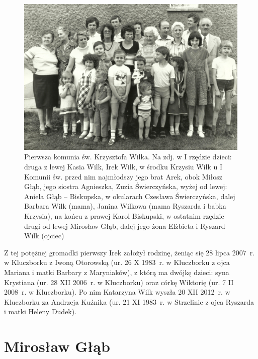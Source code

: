 \begin{figure}[!h]
\begin{center}
\includegraphics[width=\textwidth]{zdjecia/komunia_krzysztofa_wilka.jpg}
\caption[Pierwsza komunia św. Krzysztofa Wilka]{Pierwsza komunia św. Krzysztofa Wilka. Na zdj. w I rzędzie dzieci: druga z lewej Kasia Wilk, Irek Wilk, w środku Krzysiu Wilk u I Komunii św. przed nim najmłodszy jego brat Arek, obok Miłosz Głąb, jego siostra Agnieszka, Zuzia Świerczyńska, wyżej od lewej: Aniela Głąb -- Biskupska, w okularach Czesława Świerczyńska, dalej Barbara Wilk (mama), Janina Wilkowa (mama Ryszarda i babka Krzysia), na końcu z prawej Karol Biskupski, w ostatnim rzędzie drugi od lewej Mirosław Głąb, dalej jego żona Elżbieta i Ryszard Wilk (ojciec)}
\label{rys:komunia_krzysztofa_wilka}
\end{center}
\end{figure}


Z tej potężnej gromadki pierwszy Irek założył rodzinę, żeniąc się 28 lipca 2007~r. w Kluczborku z Iwoną Otorowską (ur. 26 X 1983~r. w Kluczborku z ojca Mariana i matki Barbary z Maryniaków), z którą ma dwójkę dzieci: syna Krystiana (ur. 28 XII 2006~r. w Kluczborku) oraz córkę Wiktorię (ur. 7 II 2008~r. w Kluczborku). Po nim Katarzyna Wilk wyszła 20 XII 2012~r. w Kluczborku za Andrzeja Kuźnika (ur. 21 XI 1983~r. w Strzelinie z ojca Ryszarda i matki Heleny Dudek).





\section{Mirosław Głąb}

